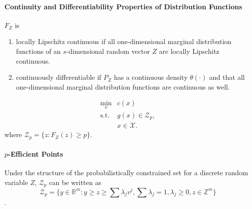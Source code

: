 \documentclass[a4pper,11pt]{article}
\begin{document}
\paragraph{Continuity and Differentiability Properties of Distribution Functions}
$F_Z$ is
\begin{enumerate}
\item locally Lipschitz continuous if all one-dimensional marginal distribution functions of an $s$-dimensional random vector $Z$ are locally Lipschitz continuous.\\
\item continuously differentiable if $P_Z$ has a continuous density $\theta(\cdot)$ and that all one-dimensional marginal distribution functions are continuous as well.\\
\end{enumerate}
\begin{equation}
    \label{4.1}
    \begin{array}{ll}
        \min_x   & c(x) \\
        \text{s.t.} & g(x)\in \mathcal Z_p,\\
        & x\in \mathcal X.
    \end{array}
\end{equation}
where $\mathcal Z_p=\{z:F_Z(z)\geq p\}$.
\paragraph{$p$-Efficient Points}

Under the structure of the probabilistically constrained set for a discrete random variable $Z$, $\mathcal Z_p$ can be written as 
$$\mathcal Z_p=\{y\in \mathbb R^m:y\geq z\geq \sum\lambda_j v^j,\sum \lambda_j=1,\lambda_j\geq 0, z\in \mathbb Z^m\}$$.
\end{document}
